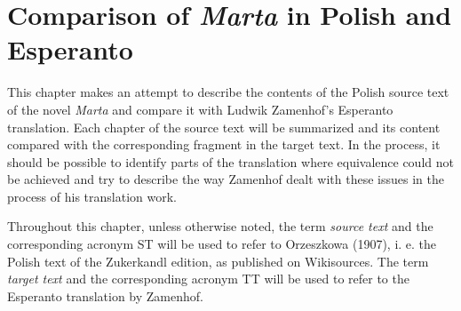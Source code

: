 \chapter{Comparison of \textit{Marta} in Polish and Esperanto}

This chapter makes an attempt to describe the contents of the Polish source text of the novel \textit{Marta} and compare it with Ludwik Zamenhof's Esperanto translation.
Each chapter of the source text will be summarized and its content compared with the corresponding fragment in the target text.
In the process, it should be possible to identify parts of the translation where equivalence could not be achieved and try to describe the way Zamenhof dealt with these issues in the process of his translation work.

Throughout this chapter, unless otherwise noted, the term \textit{source text} and the corresponding acronym ST will be used to refer to Orzeszkowa (1907), i. e. the Polish text of the Zukerkandl edition, as published on Wikisources.
The term \textit{target text} and the corresponding acronym TT will be used to refer to the Esperanto translation by Zamenhof.











